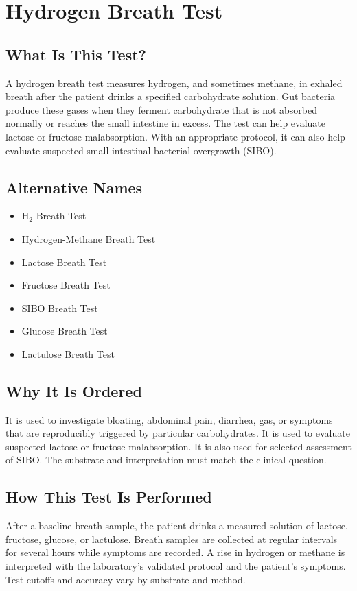 \chapter{Hydrogen Breath Test}

\section*{What Is This Test?}
A hydrogen breath test measures hydrogen, and sometimes methane, in exhaled breath after the patient drinks a specified carbohydrate solution. Gut bacteria produce these gases when they ferment carbohydrate that is not absorbed normally or reaches the small intestine in excess. The test can help evaluate lactose or fructose malabsorption. With an appropriate protocol, it can also help evaluate suspected small-intestinal bacterial overgrowth (SIBO).

\section*{Alternative Names}
\begin{itemize}
  \item H$_2$ Breath Test
  \item Hydrogen-Methane Breath Test
  \item Lactose Breath Test
  \item Fructose Breath Test
  \item SIBO Breath Test
  \item Glucose Breath Test
  \item Lactulose Breath Test
\end{itemize}
\section*{Why It Is Ordered}
It is used to investigate bloating, abdominal pain, diarrhea, gas, or symptoms that are reproducibly triggered by particular carbohydrates. It is used to evaluate suspected lactose or fructose malabsorption. It is also used for selected assessment of SIBO. The substrate and interpretation must match the clinical question.

\section*{How This Test Is Performed}
After a baseline breath sample, the patient drinks a measured solution of lactose, fructose, glucose, or lactulose. Breath samples are collected at regular intervals for several hours while symptoms are recorded. A rise in hydrogen or methane is interpreted with the laboratory's validated protocol and the patient's symptoms. Test cutoffs and accuracy vary by substrate and method.

